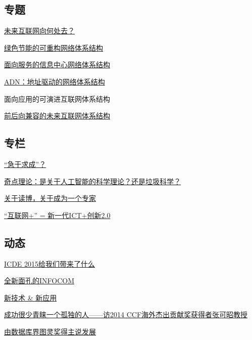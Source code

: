 \documentclass[a4paper]{article}
\begin{document}
\subsection{专题}
\href{http://history.ccf.org.cn/resources/1190201776262/2015/06/12/1.pdf}{未来互联网向何处去？}

\href{http://history.ccf.org.cn/resources/1190201776262/2015/06/12/4.pdf}{绿色节能的可重构网络体系结构}

\href{http://history.ccf.org.cn/resources/1190201776262/2015/06/12/5.pdf}{面向服务的信息中心网络体系结构}

\href{http://history.ccf.org.cn/resources/1190201776262/2015/06/12/2.pdf}{ADN：地址驱动的网络体系结构}

面向应用的可演进互联网体系结构

\href{http://history.ccf.org.cn/resources/1190201776262/2015/06/12/3.pdf}{前后向兼容的未来互联网体系结构}

\subsection{专栏}
\href{http://history.ccf.org.cn/resources/1190201776262/2015/06/12/10.pdf}{“急于求成”？}

\href{http://history.ccf.org.cn/resources/1190201776262/2015/06/12/7.pdf}{奇点理论：是关于人工智能的科学理论？还是垃圾科学？}

\href{http://history.ccf.org.cn/resources/1190201776262/2015/06/12/8.pdf}{关于读博，关于成为一个专家}

\href{http://history.ccf.org.cn/resources/1190201776262/2015/06/12/9.pdf}{“互联网+” = 新一代ICT+创新2.0}

\subsection{动态}
\href{http://history.ccf.org.cn/resources/1190201776262/2015/06/12/13.pdf}{ICDE 2015给我们带来了什么}

\href{http://history.ccf.org.cn/resources/1190201776262/2015/06/12/14.pdf}{全新面孔的INFOCOM}

\href{http://history.ccf.org.cn/resources/1190201776262/2015/06/12/15.pdf}{新技术 \& 新应用}

\href{http://history.ccf.org.cn/resources/1190201776262/2015/06/12/11.pdf}{成功很少青睐一个孤独的人——访2014 CCF海外杰出贡献奖获得者张可昭教授}

\href{http://history.ccf.org.cn/resources/1190201776262/2015/06/12/12.pdf}{由数据库界图灵奖得主说发展}
\end{document}
